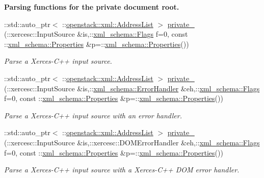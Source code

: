 \begin{Indent}{\bf Parsing functions for the private document root.}
\begin{DoxyCompactItemize}
::std::auto\_\-ptr$<$ ::\hyperlink{classopenstack_1_1xml_1_1AddressList}{openstack::xml::AddressList} $>$ \hyperlink{namespaceopenstack_1_1xml_ac872e048a626963fb3dfc3cd9072668c}{private\_\-} (::xercesc::InputSource \&is,::\hyperlink{namespacexml__schema_affb4c227cbd9aa7453dd1dc5a1401943}{xml\_\-schema::Flags} f=0, const ::\hyperlink{namespacexml__schema_ad27ce19a7ee1d3b1064092648898f64c}{xml\_\-schema::Properties} \&p=::\hyperlink{namespacexml__schema_ad27ce19a7ee1d3b1064092648898f64c}{xml\_\-schema::Properties}())
\begin{DoxyCompactList}\small\item\em Parse a Xerces-\/C++ input source. \item\end{DoxyCompactList}\item 
::std::auto\_\-ptr$<$ ::\hyperlink{classopenstack_1_1xml_1_1AddressList}{openstack::xml::AddressList} $>$ \hyperlink{namespaceopenstack_1_1xml_a58e1819f27d1cac9a8c770c2dd5440ac}{private\_\-} (::xercesc::InputSource \&is,::\hyperlink{namespacexml__schema_ab1c9361bfd3b404eaabf0c31eded79dc}{xml\_\-schema::ErrorHandler} \&eh,::\hyperlink{namespacexml__schema_affb4c227cbd9aa7453dd1dc5a1401943}{xml\_\-schema::Flags} f=0, const ::\hyperlink{namespacexml__schema_ad27ce19a7ee1d3b1064092648898f64c}{xml\_\-schema::Properties} \&p=::\hyperlink{namespacexml__schema_ad27ce19a7ee1d3b1064092648898f64c}{xml\_\-schema::Properties}())
\begin{DoxyCompactList}\small\item\em Parse a Xerces-\/C++ input source with an error handler. \item\end{DoxyCompactList}\item 
::std::auto\_\-ptr$<$ ::\hyperlink{classopenstack_1_1xml_1_1AddressList}{openstack::xml::AddressList} $>$ \hyperlink{namespaceopenstack_1_1xml_a4a92aaad231d0d409881448c6a99909a}{private\_\-} (::xercesc::InputSource \&is,::xercesc::DOMErrorHandler \&eh,::\hyperlink{namespacexml__schema_affb4c227cbd9aa7453dd1dc5a1401943}{xml\_\-schema::Flags} f=0, const ::\hyperlink{namespacexml__schema_ad27ce19a7ee1d3b1064092648898f64c}{xml\_\-schema::Properties} \&p=::\hyperlink{namespacexml__schema_ad27ce19a7ee1d3b1064092648898f64c}{xml\_\-schema::Properties}())
\begin{DoxyCompactList}\small\item\em Parse a Xerces-\/C++ input source with a Xerces-\/C++ DOM error handler. \item\end{DoxyCompactList}\item 

\end{DoxyCompactItemize}
\end{Indent}
